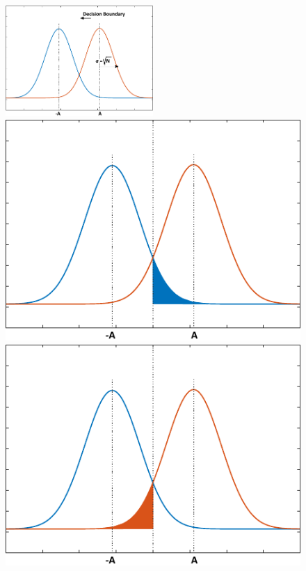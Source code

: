 	\begin{figure}[]
		\centering
		\begin{minipage}{1\textwidth}
			\centering
			\includegraphics[width=0.50\textwidth]{./sdf/m_qam_system/figures/gaussians.pdf}
			\subcaption{}
		\end{minipage}
		\begin{minipage}{0.35\textwidth}
			\centering
			\includegraphics[width=1\textwidth]{./sdf/m_qam_system/figures/gaussian_error_blue.pdf}
			\subcaption{}
		\end{minipage}
		\begin{minipage}{0.35\textwidth}
			\centering
			\includegraphics[width=1\textwidth]{./sdf/m_qam_system/figures/gaussian_error_orange.pdf}

\end{minipage}
\end{figure}
